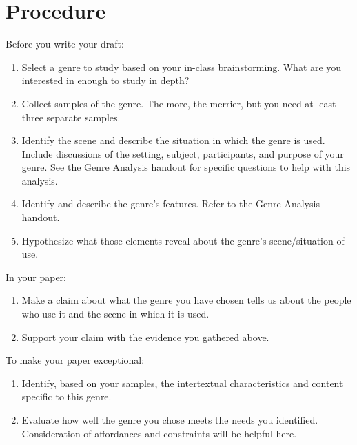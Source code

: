 \documentclass[10pt, oneside, twocolumn]{amsart}	%
\begin{document}
\section{Procedure} %
\label{sec:procedure}
\noindent Before you write your draft:
		\begin{enumerate}
			\item Select a genre to study based on your in-class brainstorming. What are you interested in enough to study in depth?
			\item Collect samples of the genre. The more, the merrier, but you need at least three separate samples.
			\item Identify the scene and describe the situation in which the genre is used. Include discussions of the setting, subject, participants, and purpose of your genre. See the Genre Analysis handout for specific questions to help with this analysis.
			\item Identify and describe the genre's features. Refer to the Genre Analysis handout.
			\item Hypothesize what those elements reveal about the genre's scene/situation of use.
		\end{enumerate}
In your paper:
		\begin{enumerate}
			\item Make a claim about what the genre you have chosen tells us about the people who use it and the scene in which it is used.
			\item Support your claim with the evidence you gathered above.
		\end{enumerate}
To make your paper exceptional:
		\begin{enumerate}
			\item Identify, based on your samples, the intertextual characteristics and content specific to this genre.
			\item Evaluate how well the genre you chose meets the needs you identified. Consideration of affordances and constraints will be helpful here.
		\end{enumerate}
\end{document}
